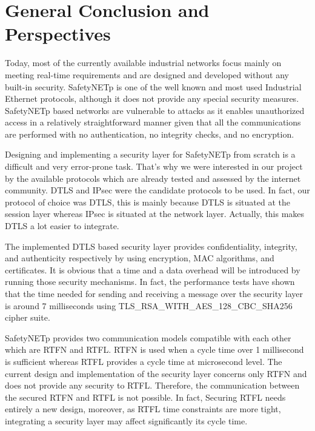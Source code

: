 %
%
%
%
%

\chapter*{General Conclusion and Perspectives}

Today, most of the currently available industrial networks focus mainly on meeting real-time requirements and are designed and developed
without any built-in security. SafetyNETp is one of the well known and most used Industrial Ethernet protocols, although it does not
provide any special security measures. SafetyNETp based networks are vulnerable to attacks as it enables unauthorized access in a
relatively straightforward manner given that all the communications are performed with no authentication, no integrity checks, and no encryption.

Designing and implementing a security layer for SafetyNETp from scratch is a difficult and very error-prone task.
That's why we were interested in our project by the available protocols which are already tested and assessed by the internet community.
DTLS and IPsec were the candidate protocols to be used. In fact, our protocol of choice was DTLS, this is mainly because DTLS is situated at the session layer
whereas IPsec is situated at the network layer. Actually, this makes DTLS a lot easier to integrate.

The implemented DTLS based security layer provides confidentiality, integrity, and authenticity respectively by
using encryption, MAC algorithms, and certificates. It is obvious that a time and a data overhead will be introduced by
running those security mechanisms. In fact, the performance tests have shown that the time needed for sending
and receiving a message over the security layer is around 7 milliseconds using
TLS\_RSA\_WITH\_AES\_128\_CBC\_SHA256 cipher suite.

SafetyNETp provides two communication models compatible with each other which are RTFN and RTFL. RTFN is
used when a cycle time over 1 millisecond is sufficient whereas RTFL provides a cycle time at microsecond
level. The current design and implementation of the security layer concerns only RTFN and does not provide
any security to RTFL. Therefore, the communication between the secured RTFN and RTFL is not
possible. In fact, Securing RTFL needs entirely a new design, moreover, as RTFL time constraints are more
tight, integrating a security layer may affect significantly its cycle time.
